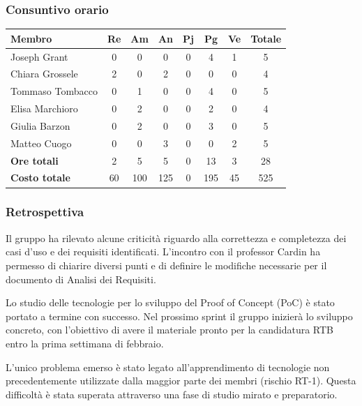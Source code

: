 \documentclass[11pt,a4paper]{article}
\begin{document}
\subsubsection{Consuntivo orario}
\begin{center}
    \begin{tabular}{|l|c|c|c|c|c|c|c|}
        \hline
        \textbf{Membro} & \textbf{Re} & \textbf{Am} & \textbf{An} & \textbf{Pj} & \textbf{Pg} & \textbf{Ve} & \textbf{Totale} \\
        \hline
        Joseph Grant & 0 & 0 & 0 & 0 & 4 & 1 & 5 \\
        \hline
        Chiara Grossele & 2 & 0 & 2 & 0 & 0 & 0 & 4 \\
        \hline
        Tommaso Tombacco & 0 & 1 & 0 & 0 & 4 & 0 & 5 \\
        \hline
        Elisa Marchioro & 0 & 2 & 0 & 0 & 2 & 0 & 4 \\
        \hline
        Giulia Barzon & 0 & 2 & 0 & 0 & 3 & 0 & 5 \\
        \hline
        Matteo Cuogo & 0 & 0 & 3 & 0 & 0 & 2 & 5 \\
        \hline
        \textbf{Ore totali} & 2 & 5 & 5 & 0 & 13 & 3 & 28 \\
        \hline
        \textbf{Costo totale} & 60 & 100 & 125 & 0 & 195 & 45 & 525 \\
        \hline
    \end{tabular}
\end{center}

\subsubsection{Retrospettiva}
Il gruppo ha rilevato alcune criticità riguardo alla correttezza e completezza dei casi d’uso e dei requisiti identificati. L’incontro con il professor Cardin ha permesso di chiarire diversi punti e di definire le modifiche necessarie per il documento di Analisi dei Requisiti.

Lo studio delle tecnologie per lo sviluppo del Proof of Concept (PoC) è stato portato a termine con successo. Nel prossimo sprint il gruppo inizierà lo sviluppo concreto, con l’obiettivo di avere il materiale pronto per la candidatura RTB entro la prima settimana di febbraio.

L’unico problema emerso è stato legato all’apprendimento di tecnologie non precedentemente utilizzate dalla maggior parte dei membri (rischio RT-1). Questa difficoltà è stata superata attraverso una fase di studio mirato e preparatorio.
\end{document}
